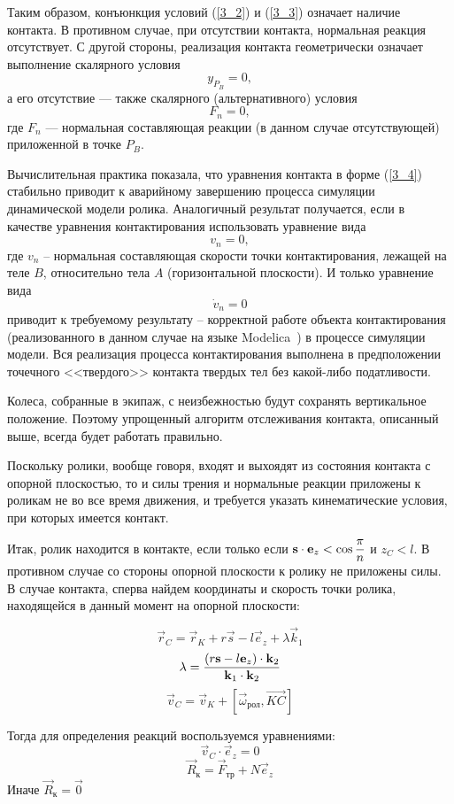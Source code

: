 Таким образом, конъюнкция условий (\ref{3_2}) и (\ref{3_3}) означает наличие
контакта. В противном случае, при отсутствии контакта, нормальная реакция 
отсутствует. С другой стороны, реализация контакта 
геометрически означает выполнение скалярного условия 
\begin{equation}
y_{P_B}=0,
\label{3_4}
\end{equation}
а его отсутствие --- также скалярного (альтернативного) условия
$$
F_n=0,
$$
где $F_n$ --- нормальная составляющая реакции (в данном случае отсутствующей) 
приложенной в точке $P_B$.


Вычислительная практика показала, что уравнения контакта в форме (\ref{3_4})
стабильно приводит к аварийному завершению процесса симуляции динамической 
модели ролика. Аналогичный результат получается, если в качестве уравнения 
контактирования использовать уравнение вида 
$$
v_n=0,
$$
где $v_n$ -- нормальная составляющая скорости точки контактирования, лежащей
на теле $B$, относительно тела $A$ (горизонтальной плоскости). И только 
уравнение вида
$$
\dot{v}_n=0
$$
приводит к требуемому результату -- корректной работе объекта контактирования
(реализованного в данном случае на языке Modelica~\cite{Fritzson}) в процессе 
симуляции модели. Вся реализация процесса контактирования 
выполнена в предположении точечного <<твердого>> контакта твердых тел без 
какой-либо податливости.

Колеса, собранные в экипаж, с неизбежностью будут сохранять вертикальное 
положение. Поэтому упрощенный алгоритм отслеживания контакта, описанный выше,
всегда будет работать правильно.

Поскольку ролики, вообще говоря, входят и выхоядят из состояния контакта с опорной плоскостью, то и силы трения и нормальные реакции приложены к роликам не во все время движения, и требуется указать кинематические условия, при которых имеется контакт.

Итак, ролик находится в контакте, если только если $\boldsymbol{\mathbf{s}} \cdot \boldsymbol{\mathbf{e}}_z < \cos\displaystyle\frac{\displaystyle \pi}{\displaystyle n} $ и $ z_C < l $. В противном случае со стороны опорной плоскости к ролику не приложены силы. В случае контакта, сперва найдем координаты и скорость точки ролика, находящейся в данный момент на опорной плоскости:

$$ \vec{r}_C = \vec{r}_K + r\vec{s} - l\vec{e}_z + \lambda\vec{k}_1 $$
$$ \lambda = \displaystyle\frac{\displaystyle \left(r\boldsymbol{\mathbf{s}} - l\boldsymbol{\mathbf{e}}_z\right)\cdot\boldsymbol{\mathbf{k}}_2}{\displaystyle  \boldsymbol{\mathbf{k}}_1\cdot\boldsymbol{\mathbf{k}}_2} $$
$$ \vec{v}_C = \vec{v}_K + [ \vec{\omega}_{\text{рол}}, \overrightarrow{KC} ] $$

Тогда для определения реакций воспользуемся уравнениями:
$$ \vec{v}_C \cdot \vec{e}_z = 0 $$
$$ \vec{R}_{\text{к}} = \vec{F}_{\text{тр}} + N\vec{e}_z $$
Иначе $ \vec{R}_{\text{к}} = \vec{0} $
